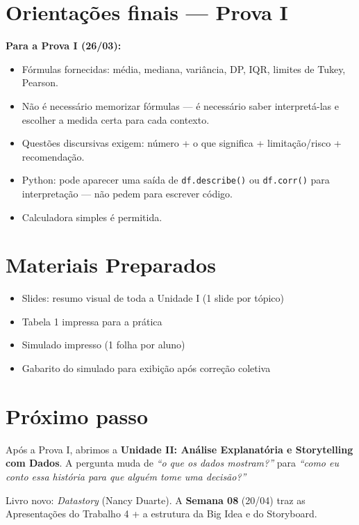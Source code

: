 \section{Orientações finais — Prova I}

\begin{NoteBox}
\textbf{Para a Prova I (26/03):}
\begin{itemize}
  \item Fórmulas fornecidas: média, mediana, variância, DP, IQR, limites de Tukey, Pearson.
  \item Não é necessário memorizar fórmulas — é necessário saber interpretá-las e escolher
  a medida certa para cada contexto.
  \item Questões discursivas exigem: número + o que significa + limitação/risco + recomendação.
  \item Python: pode aparecer uma saída de \texttt{df.describe()} ou \texttt{df.corr()} para
  interpretação — não pedem para escrever código.
  \item Calculadora simples é permitida.
\end{itemize}
\end{NoteBox}

\section{Materiais Preparados}
\begin{itemize}
  \item Slides: resumo visual de toda a Unidade I (1 slide por tópico)
  \item Tabela 1 impressa para a prática
  \item Simulado impresso (1 folha por aluno)
  \item Gabarito do simulado para exibição após correção coletiva
\end{itemize}

\section{Próximo passo}

Após a Prova I, abrimos a \textbf{Unidade II: Análise Explanatória e
Storytelling com Dados}. A pergunta muda de \emph{``o que os dados mostram?''}
para \emph{``como eu conto essa história para que alguém tome uma decisão?''}

Livro novo: \textit{Datastory} (Nancy Duarte). A \textbf{Semana 08} (20/04)
traz as Apresentações do Trabalho 4 + a estrutura da Big Idea e do Storyboard.
